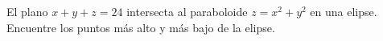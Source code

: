\item El plano $x + y + z = 24$ intersecta al paraboloide $z = x^2 + y^2$ en una elipse. Encuentre los puntos más alto y más bajo de la elipse.

